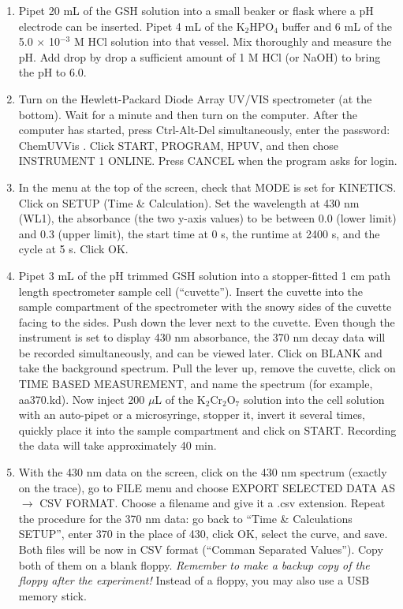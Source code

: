 \documentclass[byrevtex,amssymb,aps,pra,floatfix,letterpaper]{revtex4}
\begin{document}
\noindent
\begin{enumerate}
\item Pipet 20 mL of the GSH solution into a small beaker or flask where a pH electrode can be inserted. Pipet 4 mL of the K$_2$HPO$_4$ buffer and 6 mL of the 5.0 $\times$ 10$^{-3}$ M HCl solution into that vessel. Mix thoroughly and measure the pH. Add drop by drop a sufficient amount of 1 M HCl (or NaOH) to bring the pH to 6.0.

\item Turn on the Hewlett-Packard Diode Array UV/VIS spectrometer (at the bottom). Wait for a minute and then turn on the computer. After the computer has started, press Ctrl-Alt-Del simultaneously, enter the password: ChemUVVis . Click START, PROGRAM, HPUV, and then chose INSTRUMENT 1 ONLINE. Press CANCEL when the program asks for login.

\item In the menu at the top of the screen, check that MODE is set for KINETICS. Click on SETUP (Time \& Calculation). Set the wavelength at 430 nm (WL1), the absorbance (the two y-axis values) to be between 0.0 (lower limit) and 0.3 (upper limit), the start time at 0 s, the runtime at 2400 s, and the cycle at 5 s. Click OK.

\item Pipet 3 mL of the pH trimmed GSH solution into a stopper-fitted 1 cm path length spectrometer sample cell (``cuvette''). Insert the cuvette into the sample compartment of the spectrometer with the snowy sides of the cuvette facing to the sides. Push down the lever next to the cuvette. Even though the instrument is set to display 430 nm absorbance, the 370 nm decay data will be recorded simultaneously, and can be viewed later. Click on BLANK and take the background spectrum. Pull the lever up, remove the cuvette, click on TIME BASED MEASUREMENT, and name the spectrum (for example, aa370.kd). Now inject 200 $\mu$L of the K$_2$Cr$_2$O$_7$ solution into the cell solution with an auto-pipet or a microsyringe, stopper it, invert it several times, quickly place it into the sample compartment and click on START. Recording the data will take approximately 40 min.

\item With the 430 nm data on the screen, click on the 430 nm spectrum (exactly on the trace), go to FILE menu and choose EXPORT SELECTED DATA AS $\rightarrow$ CSV FORMAT. Choose a filename and give it a .csv extension. Repeat the procedure for the 370 nm data: go back to ``Time \& Calculations SETUP'', enter 370 in the place of 430, click OK, select the curve, and save. Both files will be now in CSV format (``Comman Separated Values''). Copy both of them on a blank floppy. \textit{Remember to make a backup copy of the floppy after the experiment!} Instead of a floppy, you may also use a USB memory stick.


\end{enumerate}
\end{document}
